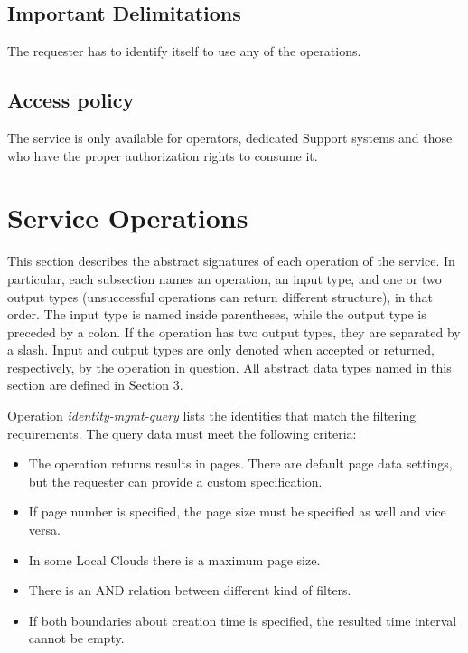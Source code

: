 \documentclass[a4paper]{arrowhead}
\begin{document}
\subsection{Important Delimitations}
\label{sec:delimitations}

The requester has to identify itself to use any of the operations.

\subsection{Access policy}
\label{sec:accesspolicy}

The service is only available for operators, dedicated Support systems and those who have the proper authorization rights to consume it.

\newpage

\section{Service Operations}
\label{sec:functions}

This section describes the abstract signatures of each operation of the service. 
In particular, each subsection names an operation, an input type, and one or two output types (unsuccessful operations can return different structure), in that order.
The input type is named inside parentheses, while the output type is preceded by a colon. If the operation has two output types, they are separated by a slash.
Input and output types are only denoted when accepted or returned, respectively, by the operation in question. All abstract data types named in this section are defined in Section 3.

{}

Operation \textit{identity-mgmt-query} lists the identities that match the filtering requirements. The query data must meet the following criteria:

\begin{itemize}
    \item The operation returns results in pages. There are default page data settings, but the requester can provide a custom specification.
    \item If page number is specified, the page size must be specified as well and vice versa.
    \item In some Local Clouds there is a maximum page size.
    \item There is an AND relation between different kind of filters.
    \item If both boundaries about creation time is specified, the resulted time interval cannot be empty.
\end{itemize}
\end{document}
